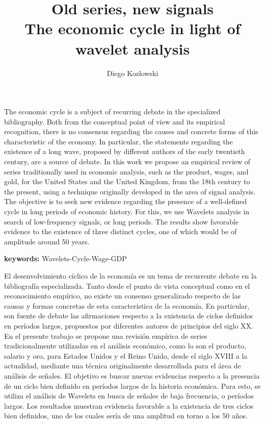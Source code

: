 \documentclass[a4paper,10cpi]{article}
\title{{\fontfamily{ptm}\selectfont \Large Old series, new signals \\
	  The economic cycle in light of wavelet analysis }}
\author[1]{Diego Kozlowski}
\affil[1]{Licenciado en Econom\'{i}a por la FCE-UBA. Maestrando en Data Mining\par
	Master in Data Mining \& Knowledge Discovery, FCEN-UBA \par
	Pabell\'{o}n I - Ciudad Universitaria, Buenos Aires, Argentina, cp: 1428 \par 
	dkozlowski@dc.uba.ar}
\date{}                     %
\renewenvironment{abstract}{
	\vspace*{\fill}
	\begin{center}%
		\bfseries\abstractname
\end{center}}%
{\vfill}
\begin{document}
	
	
	\maketitle
	
	
	
	\begin{abstract}
		The economic cycle is a subject of recurring debate in the specialized bibliography. Both from the conceptual point of view and its empirical recognition, there is no consensus regarding the causes and concrete forms of this characteristic of the economy. In particular, the statements regarding the existence of a long wave, proposed by different authors of the early twentieth century, are a source of debate. In this work we propose an empirical review of series traditionally used in economic analysis, such as the product, wages, and gold, for the United States and the United Kingdom, from the 18th century to the present, using a technique originally developed in the area of ​​signal analysis. The objective is to seek new evidence regarding the presence of a well-defined cycle in long periods of economic history. For this, we use Wavelets analysis in search of low-frequency signals, or long periods. The results show favorable evidence to the existence of three distinct cycles, one of which would be of amplitude around 50 years.
	\end{abstract}
	
	\textbf{keywords:} Wavelets-Cycle-Wage-GDP
	\medskip
	
	\pagebreak
	

	\justify
	
	\begin{abstract}
		El desenvolvimiento cíclico de la economía es un tema de recurrente debate en la bibliografía especializada. Tanto desde el punto de vista conceptual como en el reconocimiento empírico, no existe un consenso generalizado respecto de las causas y formas concretas de esta característica de la economía. En particular, son fuente de debate las afirmaciones respecto a la existencia de ciclos definidos en períodos largos, propuestos por diferentes autores de principios del siglo XX. En el presente trabajo se propone una revisión empírica de series tradicionalmente utilizadas en el análisis económico, como lo son el producto, salario y oro, para Estados Unidos y el Reino Unido, desde el siglo XVIII a la actualidad, mediante una técnica originalmente desarrollada para el área de análisis de señales. El objetivo es buscar nuevas evidencias respecto a la presencia de un ciclo bien definido en períodos largos de la historia económica. Para esto, se utiliza el análisis de Wavelets en busca de señales de baja frecuencia, o períodos largos. Los resultados muestran evidencia favorable a la existencia de tres ciclos bien definidos, uno de los cuales sería de una amplitud en torno a los 50 años.
	\end{abstract}
\end{document}
